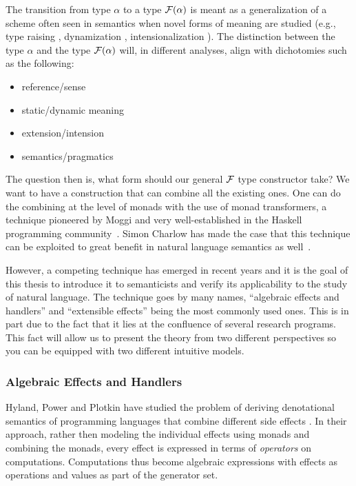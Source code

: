 The transition from type $\alpha$ to a type $\mathcal{F}(\alpha)$ is meant
as a generalization of a scheme often seen in semantics when novel forms of
meaning are studied (e.g., type raising \cite{montague1973proper},
dynamization \cite{lebedeva2012expression}, intensionalization
\cite{de2013note}). The distinction between the type $\alpha$ and the type
$\mathcal{F}(\alpha)$ will, in different analyses, align with dichotomies
such as the following:

\begin{itemize}
\item reference/sense
\item static/dynamic meaning
\item extension/intension
\item semantics/pragmatics
\end{itemize}

The question then is, what form should our general $\mathcal{F}$ type constructor
take? We want to have a construction that can combine all the existing
ones. One can do the combining at the level of monads with the use of monad
transformers, a technique pioneered by Moggi and very well-established in
the Haskell programming community~\cite{moggi1991notions}. Simon Charlow
has made the case that this technique can be exploited to great benefit in
natural language semantics as well~\cite{charlow2014semantics}.

However, a competing technique has emerged in recent years and it is the
goal of this thesis to introduce it to semanticists and verify its
applicability to the study of natural language. The technique goes by many
names, ``algebraic effects and handlers'' and ``extensible effects'' being
the most commonly used ones. This is in part due to the fact that it lies
at the confluence of several research programs. This fact will allow us to
present the theory from two different perspectives so you can be equipped
with two different intuitive models.


\subsubsection*{Algebraic Effects and Handlers}

Hyland, Power and Plotkin have studied the problem of deriving denotational
semantics of programming languages that combine different side effects
\cite{hyland2006combining}. In their approach, rather then modeling the
individual effects using monads and combining the monads, every effect is
expressed in terms of \emph{operators} on computations. Computations thus
become algebraic expressions with effects as operations and values as part
of the generator set.

